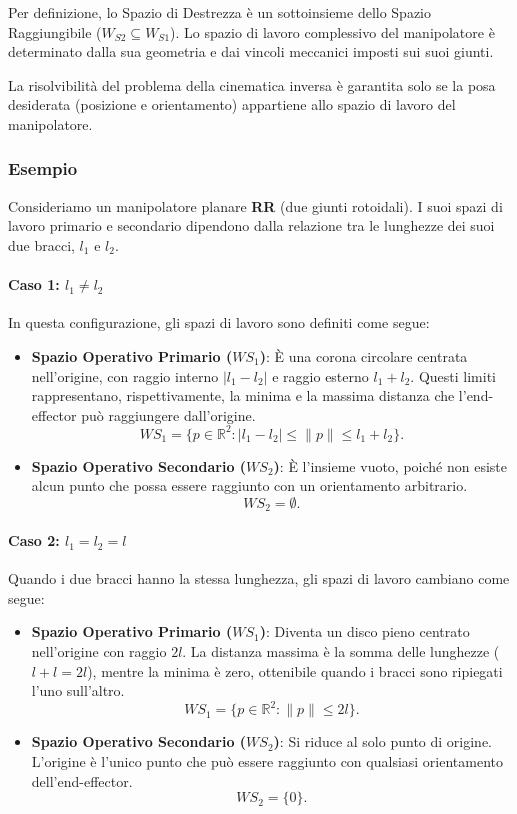 \documentclass[11pt, a4paper]{report}
\begin{document}
Per definizione, lo Spazio di Destrezza è un sottoinsieme dello Spazio Raggiungibile (\( W_{S2} \subseteq W_{S1} \)). Lo spazio di lavoro complessivo del manipolatore è determinato dalla sua geometria e dai vincoli meccanici imposti sui suoi giunti.

La risolvibilità del problema della cinematica inversa è garantita solo se la posa desiderata (posizione e orientamento) appartiene allo spazio di lavoro del manipolatore.

\subsubsection*{Esempio}
Consideriamo un manipolatore planare \textbf{RR} (due giunti rotoidali). I suoi spazi di lavoro primario e secondario dipendono dalla relazione tra le lunghezze dei suoi due bracci, \( l_1 \) e \( l_2 \).

\paragraph{Caso 1: \(l_1 \neq l_2\)}
In questa configurazione, gli spazi di lavoro sono definiti come segue:
\begin{itemize}
    \item \textbf{Spazio Operativo Primario (\(WS_1\))}: È una corona circolare centrata nell'origine, con raggio interno \(|l_1 - l_2|\) e raggio esterno \(l_1 + l_2\). Questi limiti rappresentano, rispettivamente, la minima e la massima distanza che l'end-effector può raggiungere dall'origine.
    $$
        WS_{1} = \big\{ p \in \mathbb{R}^2 : |l_{1} - l_{2}| \leq \|p\| \leq l_{1} + l_{2} \big\}.
    $$

    \item \textbf{Spazio Operativo Secondario (\(WS_2\))}: È l'insieme vuoto, poiché non esiste alcun punto che possa essere raggiunto con un orientamento arbitrario.
    $$
    WS_2 = \emptyset.
    $$
\end{itemize}

\paragraph{Caso 2: \(l_1 = l_2 = l\)}
Quando i due bracci hanno la stessa lunghezza, gli spazi di lavoro cambiano come segue:
\begin{itemize}
    \item \textbf{Spazio Operativo Primario (\(WS_1\))}: Diventa un disco pieno centrato nell'origine con raggio \(2l\). La distanza massima è la somma delle lunghezze (\(l+l=2l\)), mentre la minima è zero, ottenibile quando i bracci sono ripiegati l'uno sull'altro.
    $$
    WS_1 = \big\{ p \in \mathbb{R}^2 : \|p\| \leq 2l \big\}.
    $$

    \item \textbf{Spazio Operativo Secondario (\(WS_2\))}: Si riduce al solo punto di origine. L'origine è l'unico punto che può essere raggiunto con qualsiasi orientamento dell'end-effector.
    $$
    WS_2 = \{0\}.
    $$
\end{itemize}
\end{document}
